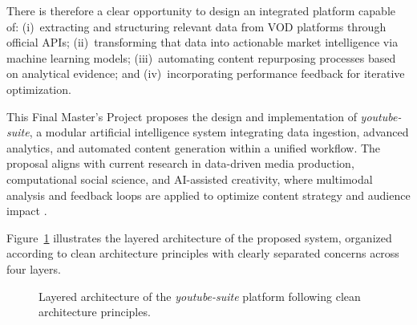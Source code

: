 \documentclass[ENG]{TFUOC}
\begin{document}
There is therefore a clear opportunity to design an integrated platform capable of: (i)~extracting and structuring relevant data from VOD platforms through official APIs; (ii)~transforming that data into actionable market intelligence via machine learning models; (iii)~automating content repurposing processes based on analytical evidence; and (iv)~incorporating performance feedback for iterative optimization.

This Final Master's Project proposes the design and implementation of \textit{youtube-suite}, a modular artificial intelligence system integrating data ingestion, advanced analytics, and automated content generation within a unified workflow. The proposal aligns with current research in data-driven media production, computational social science, and AI-assisted creativity, where multimodal analysis and feedback loops are applied to optimize content strategy and audience impact \cite{ai_content_creation}.

Figure~\ref{fig:architecture} illustrates the layered architecture of the proposed system, organized according to clean architecture principles with clearly separated concerns across four layers.

\begin{figure}[H]
\centering
{}
\caption{Layered architecture of the \textit{youtube-suite} platform following clean architecture principles.}
\label{fig:architecture}
\end{figure}
\end{document}

